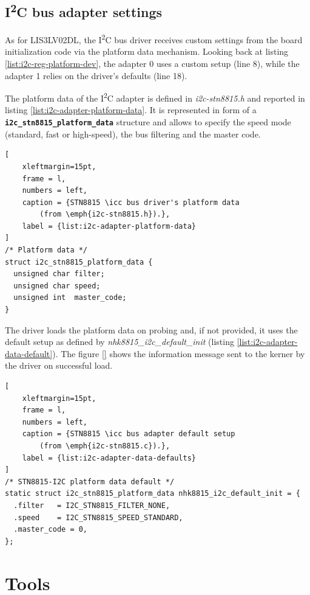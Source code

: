\documentclass[a4paper,10pt]{article}
\newcommand{\icc}{I\textsuperscript{2}C }
\newcommand{\keyword}[1]{\texttt{\textbf{#1}}}
\begin{document}
\begin{multicols}{2}
\subsection{\icc bus adapter settings}
\label{sec:adapter_settings}

As for LIS3LV02DL, the \icc bus driver receives custom settings from the board
initialization code via the platform data mechanism.
Looking back at listing \ref{list:i2c-reg-platform-dev}, the adapter 0 uses a
custom setup (line 8), while the adapter 1 relies on the driver's defaults
(line 18).

The platform data of the \icc adapter is defined in \emph{i2c-stn8815.h} and
reported in listing \ref{list:i2c-adapter-platform-data}.
It is represented in form of a \keyword{i2c\_stn8815\_platform\_data} structure
and allows to specify the speed mode (standard, fast or high-speed), 
the bus filtering and the master code.

\begin{lstlisting}[
	xleftmargin=15pt,
	frame = l,
	numbers = left,
	caption = {STN8815 \icc bus driver's platform data
		(from \emph{i2c-stn8815.h}).},
	label = {list:i2c-adapter-platform-data}
]
/* Platform data */
struct i2c_stn8815_platform_data {
  unsigned char filter;
  unsigned char speed;
  unsigned int  master_code;
}
\end{lstlisting}

The driver loads the platform data on probing and, if not provided, it uses the default setup as defined by \emph{nhk8815\_i2c\_default\_init}
(listing \ref{list:i2c-adapter-data-default}).
The figure \ref{} shows the information message sent to the kerner by the driver
on successful load.

\begin{lstlisting}[
	xleftmargin=15pt,
	frame = l,
	numbers = left,
	caption = {STN8815 \icc bus adapter default setup
		(from \emph{i2c-stn8815.c}).},
	label = {list:i2c-adapter-data-defaults}
]
/* STN8815-I2C platform data default */
static struct i2c_stn8815_platform_data nhk8815_i2c_default_init = {
  .filter	= I2C_STN8815_FILTER_NONE,
  .speed	= I2C_STN8815_SPEED_STANDARD,
  .master_code = 0,
};
\end{lstlisting}




\section{Tools}
\label{sec:tools}


\end{multicols}
\end{document}
